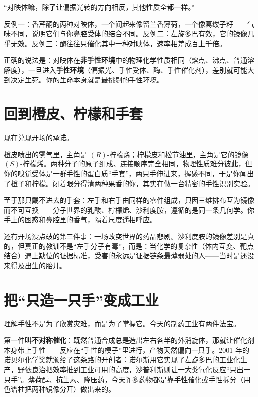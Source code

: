 \begin{wuqu}
“对映体嘛，除了让偏振光转的方向相反，其他性质全都一样。”

反例一：香芹酮的两种对映体，一个闻起来像留兰香薄荷，一个像葛缕子籽——气味不同，说明它们与你鼻腔受体的结合不同。反例二：左旋多巴有效，它的镜像几乎无效。反例三：酶往往只催化其中一种对映体，速率相差成百上千倍。

正确的说法是：对映体在\textbf{非手性环境}中的物理化学性质相同（熔点、沸点、普通溶解度），一旦进入\textbf{手性环境}（偏振光、手性受体、酶、手性催化剂），差别就可能大到决定生死。你的生命本身就是最挑剔的手性环境。
\end{wuqu}

\section{回到橙皮、柠檬和手套}

现在兑现开场的承诺。

橙皮喷出的雾气里，主角是 $(R)$-柠檬烯；柠檬皮和松节油里，主角是它的镜像 $(S)$-柠檬烯。两种分子的原子组成、连接顺序完全相同，物理性质难分彼此，但你的嗅觉受体是一群手性的蛋白质“手套”，两只手伸进来，握感不同，于是你闻出了橙子和柠檬。闭着眼分得清两种果香的你，其实在做一台精密的手性识别实验。

至于那只戴不进去的手套：左手和右手由同样的零件组成，只因三维排布互为镜像而不可互换——分子世界的乳酸、柠檬烯、沙利度胺，遵循的是同一条几何学。你手上的困惑和鼻腔里的香气，隔着尺度遥相呼应。

还有开场没点破的第三件事：一场改变世界的药品悲剧。沙利度胺的镜像差别是真的，但真正的教训不是“左手分子有毒”，而是：当化学的复杂性（体内互变、靶点结合）遇上缺位的证据标准，受害的永远是证据链条最薄弱处的人——当时是还没来得及出生的胎儿。

\section{把“只造一只手”变成工业}

理解手性不是为了欣赏灾难，而是为了掌握它。今天的制药工业有两件法宝。

第一件叫\textbf{不对称催化}：既然普通合成总是造出左右各半的外消旋体，那就让催化剂本身带上手性——反应在“手性的模子”里进行，产物天然偏向一只手。2001 年的诺贝尔化学奖就颁给了这条路的开创者：诺尔斯用它实现了左旋多巴的工业化生产，野依良治把效率推到工业可用的高度，沙普利斯则让一大类氧化反应“只出一只手”。薄荷醇、抗生素、降压药，今天许多药物都是靠手性催化或手性拆分（用色谱柱把两种镜像分开）做出来的。

